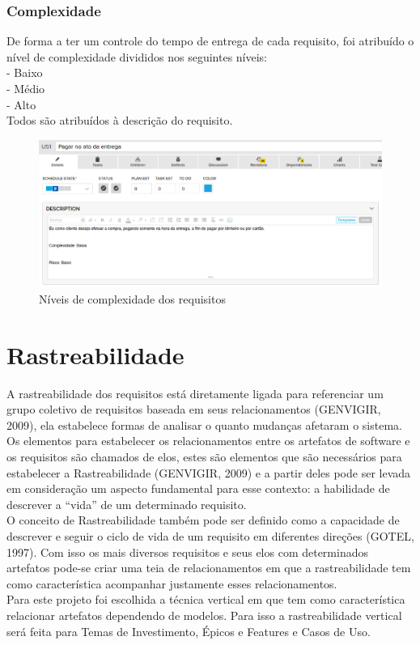 \subsubsection{Complexidade}

De forma a ter um controle do tempo de entrega de cada requisito, foi atribuído o nível de complexidade divididos nos seguintes níveis:\\
\tab - Baixo\\
\tab - Médio\\
\tab - Alto\\
Todos são atribuídos à descrição do requisito.\\


\begin{figure}[h]
    \centering
    \label{fig01}
        \includegraphics[keepaspectratio=true,scale=0.4]{figuras/RallyDev/risco.eps}
    \caption{Níveis de complexidade dos requisitos}
\end{figure}


\section{Rastreabilidade}

A rastreabilidade dos requisitos está diretamente ligada para referenciar um grupo coletivo de requisitos baseada em seus relacionamentos (GENVIGIR, 2009), ela estabelece formas de analisar o quanto mudanças afetaram o sistema.
Os elementos para estabelecer os relacionamentos entre os artefatos de software e os requisitos são chamados de elos, estes são elementos que são necessários para estabelecer a Rastreabilidade (GENVIGIR, 2009) e a partir deles pode ser levada em consideração um aspecto fundamental para esse contexto: a habilidade de descrever a “vida” de um determinado requisito. \\
O conceito de Rastreabilidade também pode ser definido como a capacidade de descrever e seguir o ciclo de vida de um requisito em diferentes direções (GOTEL, 1997). Com isso os mais diversos requisitos e seus elos com determinados artefatos pode-se criar uma teia de relacionamentos em que a rastreabilidade tem como característica acompanhar justamente esses relacionamentos.\\
Para este projeto foi escolhida a técnica vertical em que tem como característica relacionar artefatos dependendo de modelos. Para isso a rastreabilidade vertical será feita para Temas de Investimento, Épicos e Features e Casos de Uso.\\

